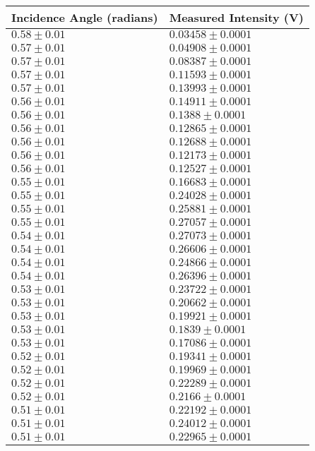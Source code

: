\begin{tabular}{| p{} | p{} |}
\hline
Incidence Angle (radians) & Measured Intensity (V)\\
\hline
$0.58 \pm 0.01$ & $0.03458 \pm 0.0001$\\
$0.57 \pm 0.01$ & $0.04908 \pm 0.0001$\\
$0.57 \pm 0.01$ & $0.08387 \pm 0.0001$\\
$0.57 \pm 0.01$ & $0.11593 \pm 0.0001$\\
$0.57 \pm 0.01$ & $0.13993 \pm 0.0001$\\
$0.56 \pm 0.01$ & $0.14911 \pm 0.0001$\\
$0.56 \pm 0.01$ & $0.1388 \pm 0.0001$\\
$0.56 \pm 0.01$ & $0.12865 \pm 0.0001$\\
$0.56 \pm 0.01$ & $0.12688 \pm 0.0001$\\
$0.56 \pm 0.01$ & $0.12173 \pm 0.0001$\\
$0.56 \pm 0.01$ & $0.12527 \pm 0.0001$\\
$0.55 \pm 0.01$ & $0.16683 \pm 0.0001$\\
$0.55 \pm 0.01$ & $0.24028 \pm 0.0001$\\
$0.55 \pm 0.01$ & $0.25881 \pm 0.0001$\\
$0.55 \pm 0.01$ & $0.27057 \pm 0.0001$\\
$0.54 \pm 0.01$ & $0.27073 \pm 0.0001$\\
$0.54 \pm 0.01$ & $0.26606 \pm 0.0001$\\
$0.54 \pm 0.01$ & $0.24866 \pm 0.0001$\\
$0.54 \pm 0.01$ & $0.26396 \pm 0.0001$\\
$0.53 \pm 0.01$ & $0.23722 \pm 0.0001$\\
$0.53 \pm 0.01$ & $0.20662 \pm 0.0001$\\
$0.53 \pm 0.01$ & $0.19921 \pm 0.0001$\\
$0.53 \pm 0.01$ & $0.1839 \pm 0.0001$\\
$0.53 \pm 0.01$ & $0.17086 \pm 0.0001$\\
$0.52 \pm 0.01$ & $0.19341 \pm 0.0001$\\
$0.52 \pm 0.01$ & $0.19969 \pm 0.0001$\\
$0.52 \pm 0.01$ & $0.22289 \pm 0.0001$\\
$0.52 \pm 0.01$ & $0.2166 \pm 0.0001$\\
$0.51 \pm 0.01$ & $0.22192 \pm 0.0001$\\
$0.51 \pm 0.01$ & $0.24012 \pm 0.0001$\\
$0.51 \pm 0.01$ & $0.22965 \pm 0.0001$\\
\hline
\end{tabular}\\
